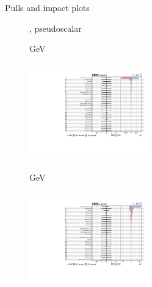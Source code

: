 \documentclass[8pt]{beamer}
\newcommand{\backupend}{
   \setcounter{framenumber}{\value{finalframe}}
}
\begin{document}
\begin{frame}{Pulls and impact plots}
\justifying
\begin{figure}[htbp]
\centering
\begin{block}{, pseudoscalar}\end{block}	\vspace{-8pt}

\begin{minipage}[b]{0.49\textwidth}
\begin{center}
\centering \begin{block}{ GeV}\end{block}	
\includegraphics[width=5.1cm, height=4.2cm]{figs/2018/impacts_2018_both_pseudo_100.pdf}
\end{center}
\end{minipage}\hfill
\begin{minipage}[b]{0.49\textwidth}
\begin{center}
\centering \begin{block}{ GeV}\end{block}	
\includegraphics[width=5.1cm, height=4.2cm]{figs/2018/impacts_2018_both_pseudo_500.pdf}
\end{center}
\end{minipage} \hfill
\end{figure}
\end{frame}

\backupend
\end{document}
